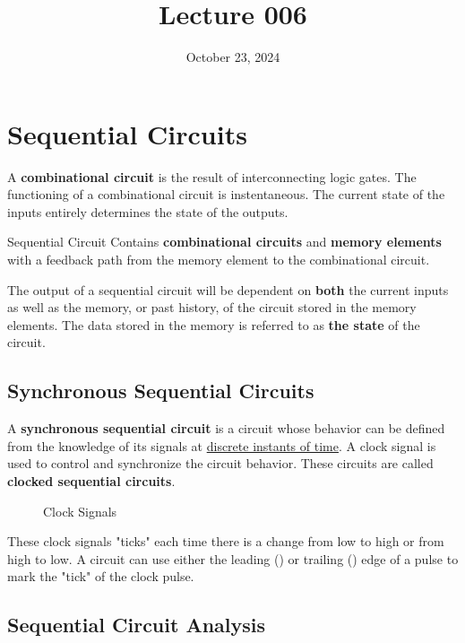 \documentclass[12pt]{article}
\title{Lecture 006}
\date{October 23, 2024}
\begin{document}
\newpage
\section{Sequential Circuits}
\label{sec:sequentialCircuits}

A \textbf{combinational circuit} is the result of interconnecting logic gates. The
functioning of a combinational circuit is instentaneous. The current state of the inputs
entirely determines the state of the outputs.

\begin{definition}{Sequential Circuit}
  Contains \textbf{combinational circuits} and \textbf{memory elements} with a feedback
  path from the memory element to the combinational circuit.
\end{definition}

The output of a sequential circuit will be dependent on \textbf{both} the current inputs
as well as the memory, or past history, of the circuit stored in the memory elements. The
data stored in the memory is referred to as \textbf{the state} of the circuit.

\subsection{Synchronous Sequential Circuits}
\label{ssec:synchronousSequentialCircuits}
A \textbf{synchronous sequential circuit} is a circuit whose behavior can be defined from
the knowledge of its signals at \uline{discrete instants of time}. A clock signal is used
to control and synchronize the circuit behavior. These circuits are called \textbf{clocked
sequential circuits}.
\begin{figure}[H]
  \centering
  
  \caption{Clock Signals}
  \label{fig:017}
\end{figure}
These clock signals "ticks" each time there is a change from low to high or from high to
low. A circuit can use either the leading
() or trailing
() edge of a pulse
to mark the "tick" of the clock pulse.

\subsection{Sequential Circuit Analysis}
\label{ssec:sequentialCircuitAnalysis}
\end{document}
